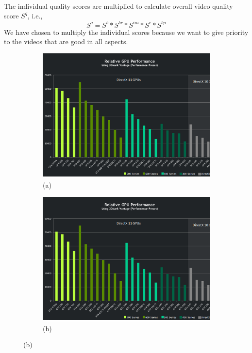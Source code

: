 \documentclass{IEEEtran}
\begin{document}
The individual quality scores are multiplied to calculate overall video quality score $S^q$, i.e.,
\[
  S^q = S^b*S^{br}*S^{im}*S^c*S^{bp} 
\]
We have chosen to multiply the individual scores because we want to give priority to the videos that are good in all aspects.
\begin{figure}[t!]
  \centering
  \begin{subfigure}[b]{0.2\linewidth}
    \includegraphics[width=\linewidth]{Performance.png}
    \caption{(a)}
  \end{subfigure}
  \begin{subfigure}[b]{0.2\linewidth}
    \includegraphics[width=\linewidth]{Performance.png}
    \caption{(b)}
  \end{subfigure}

\end{figure}
\end{document}
